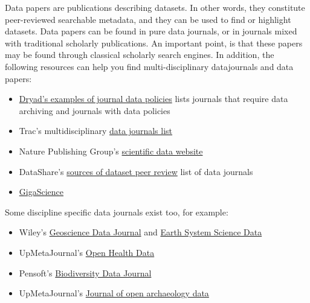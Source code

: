  Data papers are publications describing datasets. In other words, they constitute peer-reviewed searchable metadata, and they can be used to find or highlight datasets. Data papers can be found in pure data journals, or in journals mixed with traditional scholarly publications. An important point, is that these papers may be found through classical scholarly search engines. In addition, the following resources can help you find multi-disciplinary datajournals and data papers:
\begin{itemize}
\item {} \href{http://wiki.datadryad.org/Journal_instructions#Examples_of_journal_data_policies}{Dryad's examples of journal data policies} lists journals that require data archiving and journals with data policies \cite{dryad_journal_2015}
\item {} Trac's multidisciplinary \href{http://proj.badc.rl.ac.uk/preparde/blog/DataJournalsList}{data journals list}\cite{trac_blog:_2013}
\item {} Nature Publishing Group's \href{http://www.nature.com/sdata/}{scientific data website} \cite{nature_publishing_group_scientific_2015}
\item DataShare's \href{https://www.wiki.ed.ac.uk/display/datashare/Sources+of+dataset+peer+review}{sources of dataset peer review} list of data journals \cite{datashare_sources_2015}
\item {} \href{http://www.gigasciencejournal.com/}{GigaScience} \cite{gigascience_gigascience_2015}
\end{itemize}

Some discipline specific data journals exist too, for example:
\begin{itemize}
\item {}  Wiley's \href{http://onlinelibrary.wiley.com/journal/10.1002/%28ISSN%292049-6060}{Geoscience Data Journal} and \href{http://www.earth-system-science-data.net/}{Earth System Science Data} \cite{earth_system_science_data_essd_2015}
\item {} UpMetaJournal's \href{http://openhealthdata.metajnl.com/}{Open Health Data} \cite{upmetajournals_open_2015}
\item {} Pensoft's \href{http://biodiversitydatajournal.com/}{Biodiversity Data Journal} \cite{pensoft_biodiversity_2015}
\item {} UpMetaJournal's \href{http://openarchaeologydata.metajnl.com/}{Journal of open archaeology data} \cite{upmetajournals_journal_2015}
\end{itemize}

